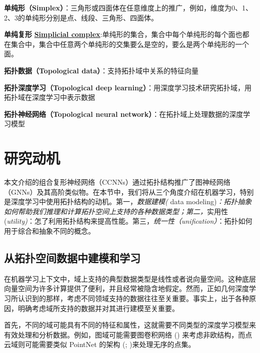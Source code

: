\documentclass[
  12pt,
]{krantz}
\begin{document}
\begin{glossarybox}
\textbf{单纯形（Simplex）}：三角形或四面体在任意维度上的推广，例如，维度为0、1、2、3的单纯形分别是点、线段、三角形、四面体。

\textbf{单纯复形}
\href{https://app.vectary.com/p/4HZRioKH7lZ2jWESIBrjhf}{\textbf{Simplicial
complex}}:单纯形的集合，集合中每个单纯形的每个面也都在集合中，集合中任意两个单纯形的交集要么是空的，要么是两个单纯形的一个面。

\textbf{拓扑数据（Topological data）}：支持拓扑域中关系的特征向量

\textbf{拓扑深度学习（Topological deep
learning）}：用深度学习技术研究拓扑域，用拓扑域在深度学习中表示数据

\textbf{拓扑神经网络（Topological neural
network）}：在拓扑域上处理数据的深度学习模型

\end{glossarybox}

\section{研究动机}\label{motivation}

本文介绍的组合复形神经网络（CCNNs）通过拓扑结构推广了图神经网络（GNNs）及其高阶类似物。在本节中，我们将从三个角度介绍在机器学习，特别是深度学习中使用拓扑结构的动机。第一，\emph{数据建模(}
data
modeling)\emph{：拓扑抽象如何帮助我们推理和计算拓扑空间上支持的各种数据类型；第二，}实用性(\emph{utility)}：怎了利用拓扑结构来提高性能。第三，\emph{统一性（unification）}：拓扑如何用于综合和抽象不同的概念。

\subsection{从拓扑空间数据中建模和学习}\label{ux4eceux62d3ux6251ux7a7aux95f4ux6570ux636eux4e2dux5efaux6a21ux548cux5b66ux4e60}

在机器学习上下文中，域上支持的典型数据类型是线性或者说向量空间。这种底层向量空间为许多计算提供了便利，并且经常被隐含地假定。然而，正如几何深度学习所认识到的那样，考虑不同领域支持的数据往往至关重要。事实上，出于各种原因，明确考虑域所支持的数据并对其进行建模至关重要。

首先，不同的域可能具有不同的特征和属性，这就需要不同类型的深度学习模型来有效处理和分析数据。例如，图域可能需要图卷积网络
()
来考虑非欧结构，而点云域则可能需要类似 PointNet 的架构
(;
)来处理无序的点集。
\end{document}
